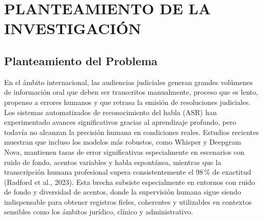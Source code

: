 \documentclass[12pt,a4paper,oneside]{report}
\begin{document}
\newpage
\thispagestyle{empty}
\mbox{}

\newpage
\tableofcontents

\newpage
\listoftables
{}

\newpage
\setcounter{page}{1}

\chapter{PLANTEAMIENTO DE LA INVESTIGACIÓN}

\section{Planteamiento del Problema}

En el ámbito internacional, las audiencias judiciales generan grandes volúmenes de información oral que deben ser transcritos manualmente, proceso que es lento, propenso a errores humanos y que retrasa la emisión de resoluciones judiciales. Los sistemas automatizados de reconocimiento del habla (ASR) han experimentado avances significativos gracias al aprendizaje profundo, pero todavía no alcanzan la precisión humana en condiciones reales. Estudios recientes muestran que incluso los modelos más robustos, como Whisper y Deepgram Nova, mantienen tasas de error significativas especialmente en escenarios con ruido de fondo, acentos variables y habla espontánea, mientras que la transcripción humana profesional supera consistentemente el 98\,\% de exactitud (Radford et al., 2023). Esta brecha subsiste especialmente en entornos con ruido de fondo y diversidad de acentos, donde la supervisión humana sigue siendo indispensable para obtener registros fieles, coherentes y utilizables en contextos sensibles como los ámbitos jurídico, clínico y administrativo.
\end{document}
